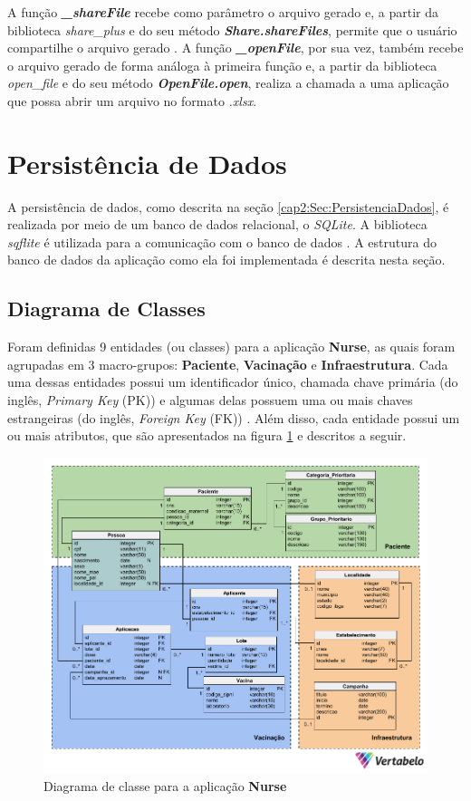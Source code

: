 A função \textbf{\textit{\_shareFile}} recebe como parâmetro o arquivo gerado e, a partir da biblioteca \textit{share\_plus} e do seu método \textbf{\textit{Share.shareFiles}}, permite que o usuário compartilhe o arquivo gerado \cite{share_plus-package}. A função \textbf{\textit{\_openFile}}, por sua vez, também recebe o arquivo gerado de forma análoga à primeira função e, a partir da biblioteca \textit{open\_file} e do seu método \textbf{\textit{OpenFile.open}}, realiza a chamada a uma aplicação que possa abrir um arquivo no formato \textit{.xlsx}.

\section{Persistência de Dados}
\label{cap4:Sec:PersistenciaDados}
A persistência de dados, como descrita na seção \ref{cap2:Sec:PersistenciaDados}, é realizada por meio de um banco de dados relacional, o \textit{SQLite}. A biblioteca \textit{sqflite} é utilizada para a comunicação com o banco de dados \cite{sqflite-package}. A estrutura do banco de dados da aplicação como ela foi implementada é descrita nesta seção.

\subsection{Diagrama de Classes}
\label{cap4:SubSec:DiagramaClasses}
Foram definidas 9 entidades (ou classes) para a aplicação \textbf{Nurse}, as quais foram agrupadas em 3 macro-grupos: \textbf{Paciente}, \textbf{Vacinação} e \textbf{Infraestrutura}. Cada uma dessas entidades possui um identificador único, chamada chave primária (do inglês, \textit{Primary Key} (PK)) e algumas delas possuem uma ou mais chaves estrangeiras (do inglês, \textit{Foreign Key} (FK)) \cite{heuser09banco}. Além disso, cada entidade possui um ou mais atributos, que são apresentados na figura \ref{fig:diagrama_classes} e descritos a seguir.

\begin{figure}[!ht]
  \centering
  \includegraphics[width=\textwidth]{figuras/cap4/4_4_1_diagrama_classes.png}
  \caption{Diagrama de classe para a aplicação \textbf{Nurse}}
  \label{fig:diagrama_classes}
\end{figure}

